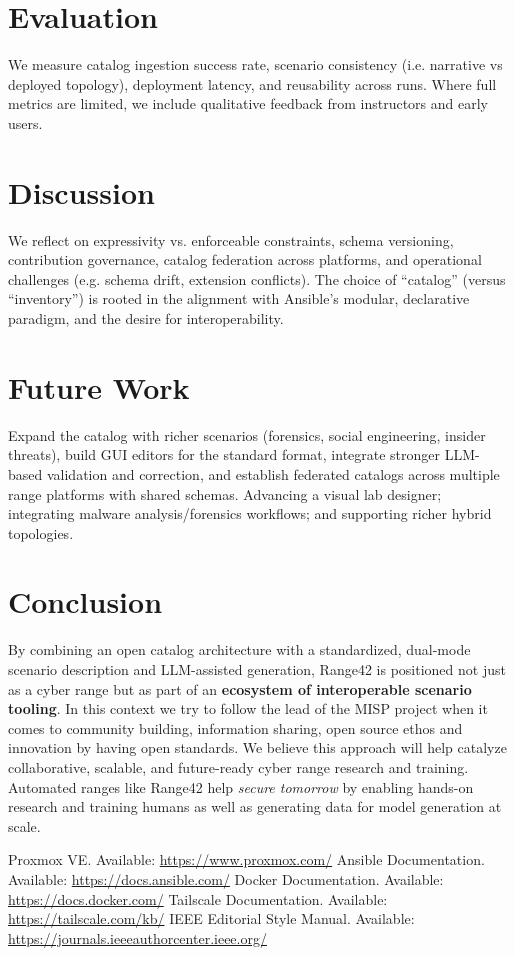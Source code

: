 \documentclass[11pt]{article}
\begin{document}
\section{Evaluation}
We measure catalog ingestion success rate, scenario consistency (i.e. narrative vs deployed topology), deployment latency, and reusability across runs. Where full metrics are limited, we include qualitative feedback from instructors and early users.

\section{Discussion}
We reflect on expressivity vs. enforceable constraints, schema versioning, contribution governance, catalog federation across platforms, and operational challenges (e.g. schema drift, extension conflicts). The choice of “catalog” (versus “inventory”) is rooted in the alignment with Ansible’s modular, declarative paradigm, and the desire for interoperability.

\section{Future Work}
Expand the catalog with richer scenarios (forensics, social engineering, insider threats), build GUI editors for the standard format, integrate stronger LLM-based validation and correction, and establish federated catalogs across multiple range platforms with shared schemas. Advancing a visual lab designer; integrating malware analysis/forensics workflows; and supporting richer hybrid topologies.

\section{Conclusion}
By combining an open catalog architecture with a standardized, dual-mode scenario description and LLM-assisted generation, Range42 is positioned not just as a cyber range but as part of an \textbf{ecosystem of interoperable scenario tooling}. In this context we try to follow the lead of the MISP project when it comes to community building, information sharing, open source ethos and innovation by having open standards.
We believe this approach will help catalyze collaborative, scalable, and future-ready cyber range research and training.
Automated ranges like Range42 help \emph{secure tomorrow} by enabling hands-on research and training humans as well as generating data for model generation at scale. 


\begin{thebibliography}{99}
 Proxmox VE. Available: \url{https://www.proxmox.com/}
 Ansible Documentation. Available: \url{https://docs.ansible.com/}
 Docker Documentation. Available: \url{https://docs.docker.com/}
 Tailscale Documentation. Available: \url{https://tailscale.com/kb/}
 IEEE Editorial Style Manual. Available: \url{https://journals.ieeeauthorcenter.ieee.org/}
\end{thebibliography}
\end{document}

